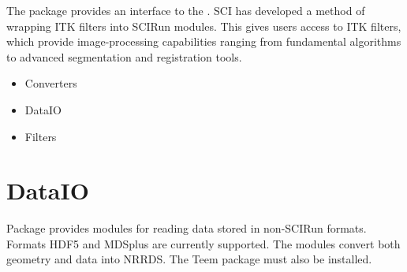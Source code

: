 The 
package provides an interface to the  .  SCI has developed a method of wrapping
ITK filters into SCIRun modules.  This gives \sr{} users access to
ITK filters, which provide image-processing capabilities ranging from
fundamental algorithms to advanced segmentation and registration
tools.

\begin{itemize}
\item Converters
\item DataIO
\item Filters
\end{itemize}

\section{DataIO}
\label{sec:dataiopackage}

Package 
provides modules for reading data stored in non-SCIRun formats.
Formats HDF5 and MDSplus are currently supported. The modules convert
both geometry and data into NRRDS. The Teem package must also be
installed.

